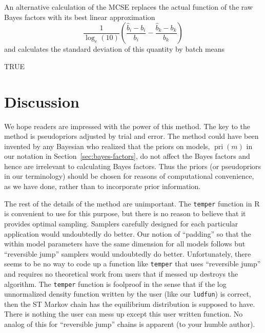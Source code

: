\documentclass[11pt]{article}
\DeclareMathOperator{\prior}{pri}
\begin{document}
An alternative calculation of the MCSE replaces the actual function
of the raw Bayes factors with its best linear approximation
$$
   \frac{1}{\log_e(10)} \left(\frac{\hat{b}_i - b_i}{b_i}
   - \frac{\hat{b}_k - b_k}{b_k} \right)
$$
and calculates the standard deviation of this quantity by batch means
\begin{Schunk}
\begin{Soutput}
[1] TRUE
\end{Soutput}
\end{Schunk}

\section{Discussion}

We hope readers are impressed with the power of this method.  The key
to the method is pseudopriors adjusted by trial and error.  The method
could have been invented by any Bayesian who realized that the priors
on models, $\prior(m)$ in our notation in Section~\ref{sec:bayes-factors},
do not affect the Bayes factors and hence are irrelevant to calculating
Bayes factors.  Thus the priors (or pseudopriors in our terminology) should
be chosen for reasons of computational convenience, as we have done,
rather than to incorporate prior information.

The rest of the details of the method are unimportant.  The \texttt{temper}
function in R is convenient to use for this purpose, but there is no reason
to believe that it provides optimal sampling.  Samplers carefully designed
for each particular application would undoubtedly do better.  Our notion
of ``padding'' so that the within model parameters have the same dimension
for all models follows \citet{carlin-chib} but ``reversible jump'' samplers
\citep{green} would undoubtedly do better.  Unfortunately, there seems to
be no way to code up a function like \texttt{temper} that uses ``reversible
jump'' and requires no theoretical work from users that if messed up destroys
the algorithm.  The \texttt{temper} function is foolproof in the sense that
if the log unnormalized density function written by the user
(like our \texttt{ludfun}) is correct, then the ST Markov chain has the
equilibrium distribution is supposed to have.  There is nothing the
user can mess up except this user written function.  No analog of this
for ``reversible jump'' chains is apparent (to your humble author).
\end{document}
